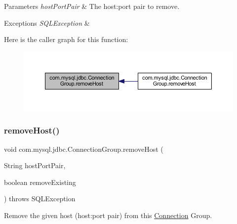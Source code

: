 \begin{DoxyParams}{Parameters}
{\em host\+Port\+Pair} & The host\+:port pair to remove. \\
\hline
\end{DoxyParams}

\begin{DoxyExceptions}{Exceptions}
{\em S\+Q\+L\+Exception} & \\
\hline
\end{DoxyExceptions}
Here is the caller graph for this function\+:\nopagebreak
\begin{figure}[H]
\begin{center}
\leavevmode
\includegraphics[width=350pt]{classcom_1_1mysql_1_1jdbc_1_1_connection_group_ae0d6740efd41c535f64998acbf213a54_icgraph}
\end{center}
\end{figure}
\mbox{\label{classcom_1_1mysql_1_1jdbc_1_1_connection_group_ac1cffa2544420e1e0304129257c97a91}} 
\subsubsection{\texorpdfstring{remove\+Host()}{removeHost()}\hspace{0.1cm}{\footnotesize\ttfamily [2/3]}}
{\footnotesize\ttfamily void com.\+mysql.\+jdbc.\+Connection\+Group.\+remove\+Host (\begin{DoxyParamCaption}\item[{String}]{host\+Port\+Pair,  }\item[{boolean}]{remove\+Existing }\end{DoxyParamCaption}) throws S\+Q\+L\+Exception}

Remove the given host (host\+:port pair) from this \mbox{\hyperlink{interfacecom_1_1mysql_1_1jdbc_1_1_connection}{Connection}} Group.


